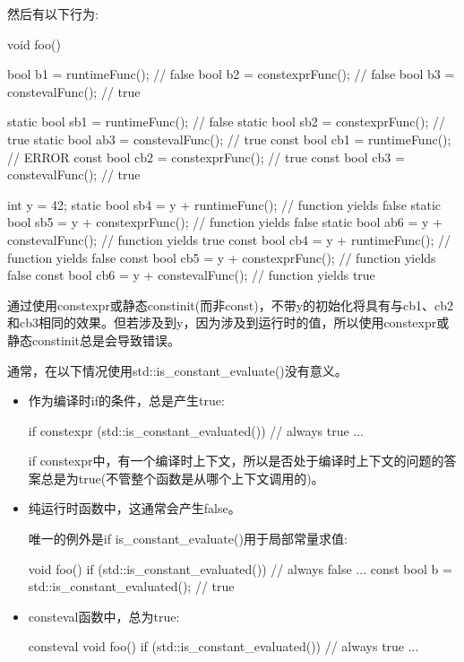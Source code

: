 然后有以下行为:

\begin{cpp}
void foo()
{
	bool b1 = runtimeFunc(); // false
	bool b2 = constexprFunc(); // false
	bool b3 = constevalFunc(); // true

	static bool sb1 = runtimeFunc(); // false
	static bool sb2 = constexprFunc(); // true
	static bool ab3 = constevalFunc(); // true
	const bool cb1 = runtimeFunc(); // ERROR
	const bool cb2 = constexprFunc(); // true
	const bool cb3 = constevalFunc(); // true

	int y = 42;
	static bool sb4 = y + runtimeFunc(); // function yields false
	static bool sb5 = y + constexprFunc(); // function yields false
	static bool ab6 = y + constevalFunc(); // function yields true
	const bool cb4 = y + runtimeFunc(); // function yields false
	const bool cb5 = y + constexprFunc(); // function yields false
	const bool cb6 = y + constevalFunc(); // function yields true
}
\end{cpp}

通过使用constexpr或静态constinit(而非const)，不带y的初始化将具有与cb1、cb2和cb3相同的效果。但若涉及到y，因为涉及到运行时的值，所以使用constexpr或静态constinit总是会导致错误。

通常，在以下情况使用std::is\_constant\_evaluate()没有意义。

\begin{itemize}
\item
作为编译时if的条件，总是产生true:

\begin{cpp}
if constexpr (std::is_constant_evaluated()) { // always true
	...
}
\end{cpp}

if constexpr中，有一个编译时上下文，所以是否处于编译时上下文的问题的答案总是为true(不管整个函数是从哪个上下文调用的)。

\item
纯运行时函数中，这通常会产生false。

唯一的例外是if is\_constant\_evaluate()用于局部常量求值:

\begin{cpp}
void foo() {
	if (std::is_constant_evaluated()) { // always false
		...
	}
	const bool b = std::is_constant_evaluated(); // true
}
\end{cpp}

\item
consteval函数中，总为true:

\begin{cpp}
consteval void foo() {
	if (std::is_constant_evaluated()) { // always true
		...
	}
}
\end{cpp}

\end{itemize}

